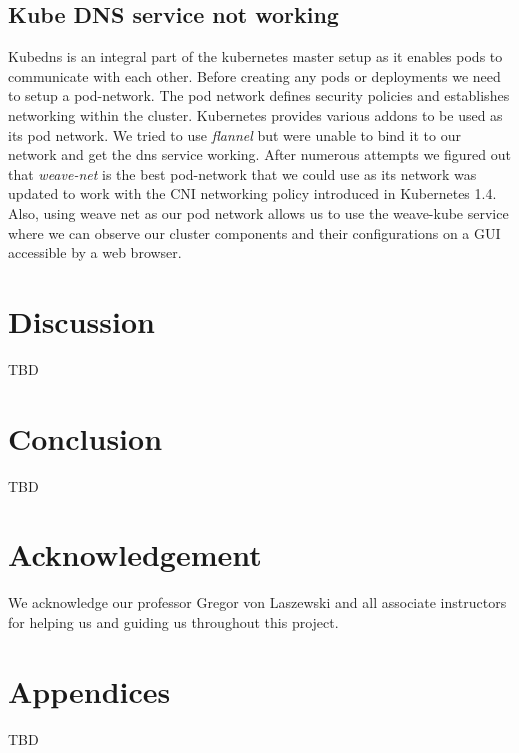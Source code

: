 \documentclass[9pt,twocolumn,twoside]{../../styles/osajnl}
\begin{document}
\subsection{Kube DNS service not working}
Kubedns is an integral part of the kubernetes master setup as it
enables pods to communicate with each other. Before creating any pods
or deployments we need to setup a pod-network. The pod network defines
security policies and establishes networking within the
cluster. Kubernetes provides various addons to be used as its pod
network. We tried to use \emph{flannel} but were unable to bind it to
our network and get the dns service working. After numerous attempts
we figured out that \emph{weave-net} is the best pod-network that we
could use as its network was updated to work with the CNI networking
policy introduced in Kubernetes 1.4. Also, using weave net as our pod
network allows us to use the weave-kube service where we can observe
our cluster components and their configurations on a GUI accessible by
a web browser.

\section{Discussion}
TBD

\section{Conclusion}

TBD

\section{Acknowledgement}

We acknowledge our professor Gregor von Laszewski and all associate
instructors for helping us and guiding us throughout this project.

\section{Appendices}
TBD


 
\end{document}
